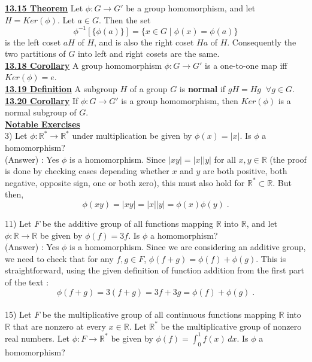 \documentclass[12pt, letterpaper]{article}
\begin{document}
\noindent \underline{\bf 13.15 Theorem} Let $\phi : G \rightarrow G'$ be a group homomorphism, and let $H = Ker(\phi)$. Let $a \in G$. Then the set $$\phi^{-1}[\{\phi(a)\}] = \{x \in G \; | \; \phi(x) = \phi(a)\}$$ is the left coset $aH$ of $H$, and is also the right coset $Ha$ of $H$. Consequently the two partitions of $G$ into left and right cosets are the same. \\

\noindent \underline{\bf 13.18 Corollary} A group homomorphism $\phi : G \rightarrow G'$ is a one-to-one map iff $Ker(\phi) = {e}$.  \\

\noindent \underline{\bf 13.19 Definition} A subgroup $H$ of a group $G$ is {\bf normal} if $gH = Hg \;\; \forall g \in G$. \\

\noindent \underline{\bf 13.20 Corollary} If $\phi : G \rightarrow G'$ is a group homomorphism, then $Ker(\phi)$ is a normal subgroup of $G$. \\

\noindent \underline{\bf Notable Exercises} \\

3) Let $\phi : \mathbb{R}^* \rightarrow \mathbb{R}^*$ under multiplication be given by $\phi(x) = |x|$. Is $\phi$ a homomorphism? \\

(Answer) : Yes $\phi$ is a homomorphism. Since $|xy| = |x||y|$ for all $x,y \in \mathbb{R}$ (the proof is done by checking cases depending  whether $x$ and $y$ are both positive, both negative, opposite sign, one or both zero), this must also hold for $\mathbb{R}^* \subset \mathbb{R}$. But then, $$\phi(xy) = |xy| = |x||y| = \phi(x)\phi(y) \;.$$


11) Let $F$ be the additive group of all functions mapping $\mathbb{R}$ into $\mathbb{R}$, and let $\phi : \mathbb{R} \rightarrow \mathbb{R}$ be given by $\phi(f) = 3f$. Is $\phi$ a homomorphism? \\

(Answer) : Yes $\phi$ is a homomorphism. Since we are considering an additive group, we need to check that for any $f,g \in F$, $\phi(f+g) = \phi(f) + \phi(g)$. This is straightforward, using the given definition of function addition from the first part of the text : $$\phi(f+g) = 3(f+g) = 3f + 3g = \phi(f) + \phi(g) \;.$$ \\

15) Let $F$ be the multiplicative group of all continuous functions mapping $\mathbb{R}$ into $\mathbb{R}$ that are nonzero at every $x \in \mathbb{R}$. Let $\mathbb{R}^*$ be the multiplicative group of nonzero real numbers. Let $\phi : F \rightarrow \mathbb{R}^*$ be given by $\phi(f) = \int_{0}^{1} f(x) \, dx$. Is $\phi$ a homomorphism? \\
\end{document}

